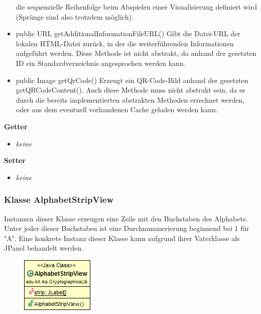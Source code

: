 \documentclass{article}
\begin{document}
\begin{itemize}
		  die sequenzielle Reihenfolge beim Abspielen einer Visualisierung definiert wird 
		  (Sprünge sind also trotzdem möglich).
        \item public URL getAdditionalInformationFileURL() \newline
          Gibt die Datei-URL der lokalen HTML-Datei zurück, in der die weiterführenden
          Informationen aufgeführt werden. Diese Methode ist nicht abstrakt, da anhand
          der gesetzten ID ein Standardverzeichnis angesprochen werden kann.
        \item public Image getQrCode() \newline
          Erzeugt ein QR-Code-Bild anhand der gesetzten getQRCodeContent(). Auch diese Methode
          muss nicht abstrakt sein, da es durch die bereits implementierten abstrakten Methoden
          errechnet werden, oder aus dem eventuell vorhandenen Cache geladen werden kann.
      \end{itemize}
      
      \textbf{Getter}
      \begin{itemize}
		\item \textit{keine}
      \end{itemize}
      
      \textbf{Setter}
      \begin{itemize}
        \item \textit{keine}
      \end{itemize}
	
	\subsubsection{Klasse AlphabetStripView}
	  Instanzen dieser Klasse erzeugen eine Zeile mit den Buchstaben des Alphabets.
	  Unter jeder dieser Buchstaben ist eine Durchnummerierung beginnend bei 1 für "A".
	  Eine konkrete Instanz dieser Klasse kann aufgrund ihrer Vaterklasse als JPanel behandelt werden.
	
      \begin{figure}[H]
        \centering
        \includegraphics[width=\textwidth]{resources/edu-kit-iks-CryptographicsLib-AlphabetStripView}
      \end{figure}
	
\end{document}
